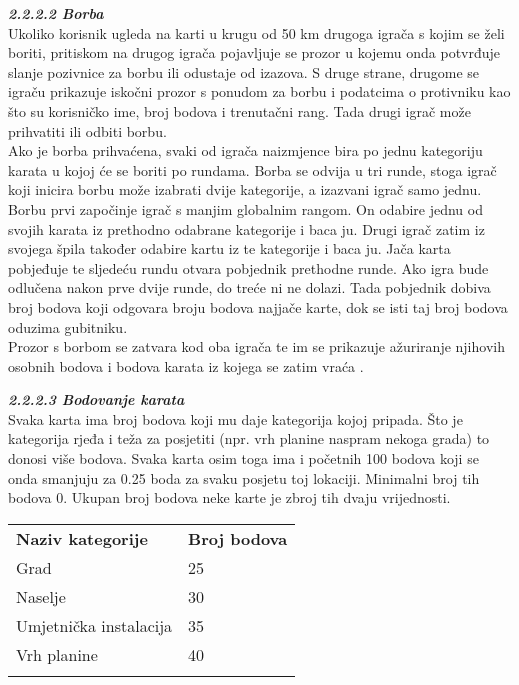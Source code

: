 		\textbf{\textit{\small2.2.2.2 Borba}}\\
		{   Ukoliko korisnik ugleda na karti u krugu od 50 km drugoga igrača s kojim se želi boriti, pritiskom na drugog igrača pojavljuje se prozor u kojemu onda potvrđuje slanje pozivnice za borbu ili odustaje od izazova. S druge strane, drugome se  igraču prikazuje iskočni prozor s ponudom za borbu i podatcima o protivniku kao što su korisničko ime, broj bodova i trenutačni rang. Tada drugi igrač može prihvatiti ili odbiti borbu. \\ Ako je borba prihvaćena, svaki od igrača naizmjence bira po jednu kategoriju karata u kojoj će se boriti po rundama. Borba se odvija u tri runde, stoga igrač koji inicira borbu može izabrati dvije kategorije, a izazvani igrač samo jednu. Borbu prvi započinje igrač s manjim globalnim rangom. On odabire jednu od svojih karata iz prethodno odabrane kategorije i baca ju. Drugi igrač zatim iz svojega špila također odabire kartu iz te kategorije i baca ju. Jača karta pobjeđuje te sljedeću rundu otvara pobjednik prethodne runde. Ako igra bude odlučena nakon prve dvije runde, do treće ni ne dolazi. Tada pobjednik dobiva broj bodova koji odgovara broju bodova najjače karte, dok se isti taj broj bodova oduzima gubitniku.\\ Prozor s borbom se zatvara kod oba igrača te im se prikazuje ažuriranje njihovih osobnih bodova i bodova karata iz kojega se zatim vraća .\\}
		
		
		\textbf{\textit{\small2.2.2.3 Bodovanje karata}}\\
		{Svaka karta ima broj bodova koji mu daje kategorija kojoj pripada. Što je kategorija rjeđa i teža za posjetiti (npr. vrh planine naspram nekoga grada) to donosi više bodova. Svaka karta osim toga ima i početnih 100 bodova koji se onda smanjuju za 0.25 boda za svaku posjetu toj lokaciji. Minimalni broj tih bodova 0. Ukupan broj bodova neke karte je zbroj tih dvaju vrijednosti.\\ }
		
		
		\begin{tabular}{ll}
			\textbf{Naziv kategorije} & \textbf{Broj bodova} \\
			Grad                      & 25                   \\
			Naselje                   & 30                   \\
			Umjetnička instalacija    & 35                   \\
			Vrh planine               & 40                   \\
				&                     
		\end{tabular}
	
